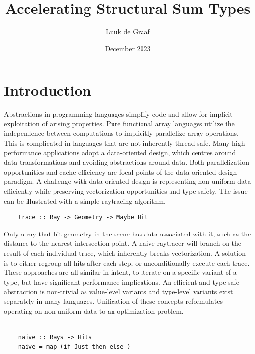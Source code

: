 \documentclass{article}
\title{Accelerating Structural Sum Types}
\author{Luuk de Graaf}
\date{December 2023}
\begin{document}
\maketitle

\tableofcontents

\newpage

\section{Introduction}

Abstractions in programming languages simplify code and allow for implicit exploitation of arising properties.
Pure functional array languages utilize the independence between computations to implicitly parallelize array operations.
This is complicated in languages that are not inherently thread-safe.
Many high-performance applications adopt a data-oriented design, which centres around data transformations and avoiding abstractions around data. 
Both parallelization opportunities and cache efficiency are focal points of the data-oriented design paradigm.
A challenge with data-oriented design is representing non-uniform data efficiently while preserving vectorization opportunities and type safety. 
The issue can be illustrated with a simple raytracing algorithm. 

\begin{verbatim}
    trace :: Ray -> Geometry -> Maybe Hit
\end{verbatim}

Only a ray that hit geometry in the scene has data associated with it, such as the distance to the nearest intersection point.
A naive raytracer will branch on the result of each individual trace, which inherently breaks vectorization.
A solution is to either regroup all hits after each step, or unconditionally execute each trace.
These approaches are all similar in intent, to iterate on a specific variant of a type, but have significant performance implications.
An efficient and type-safe abstraction is non-trivial as value-level variants and type-level variants exist separately in many languages.  
Unification of these concepts reformulates operating on non-uniform data to an optimization problem.

\begin{verbatim}

    naive :: Rays -> Hits
    naive = map (if Just then else )



\end{verbatim}
\end{document}
